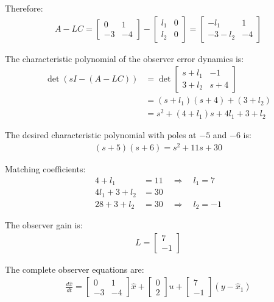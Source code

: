 \documentclass[11pt,a4paper]{article}
\begin{document}
Therefore:
\begin{align}
A - LC = \begin{bmatrix} 0 & 1 \\ -3 & -4 \end{bmatrix} - \begin{bmatrix} l_1 & 0 \\ l_2 & 0 \end{bmatrix} = \begin{bmatrix} -l_1 & 1 \\ -3-l_2 & -4 \end{bmatrix}
\end{align}

The characteristic polynomial of the observer error dynamics is:
\begin{align}
\det(sI - (A-LC)) &= \det\begin{bmatrix} s+l_1 & -1 \\ 3+l_2 & s+4 \end{bmatrix} \\
&= (s+l_1)(s+4) + (3+l_2) \\
&= s^2 + (4+l_1)s + 4l_1 + 3 + l_2
\end{align}

The desired characteristic polynomial with poles at $-5$ and $-6$ is:
\begin{align}
(s+5)(s+6) = s^2 + 11s + 30
\end{align}

Matching coefficients:
\begin{align}
4 + l_1 &= 11 \quad \Rightarrow \quad l_1 = 7 \\
4l_1 + 3 + l_2 &= 30 \\
28 + 3 + l_2 &= 30 \quad \Rightarrow \quad l_2 = -1
\end{align}

The observer gain is:
\begin{align}
L = \begin{bmatrix} 7 \\ -1 \end{bmatrix}
\end{align}

The complete observer equations are:
\begin{align}
\frac{d\hat{x}}{dt} = \begin{bmatrix} 0 & 1 \\ -3 & -4 \end{bmatrix}\hat{x} + \begin{bmatrix} 0 \\ 2 \end{bmatrix}u + \begin{bmatrix} 7 \\ -1 \end{bmatrix}(y - \hat{x}_1)
\end{align}
\end{document}
